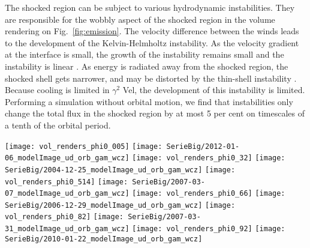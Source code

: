 \documentclass[usenatbib]{mnras}%
\begin{document}
The shocked region can be subject to various hydrodynamic instabilities. They are responsible for the wobbly aspect of the shocked region in the volume rendering on Fig.~\ref{fig:emission}. The velocity difference between the winds leads to the development of the Kelvin-Helmholtz instability.  As the velocity gradient at the interface is small, the growth of the instability remains small and the instability is linear \citep{2011MNRAS.418.2618L}.  As energy is radiated away from the shocked region, the shocked shell gets narrower, and may be distorted by the thin-shell instability \citep{1994ApJ...428..186V}. Because cooling is limited in $\gamma^2$ Vel, the development of this instability is limited. Performing a simulation without orbital motion, we find that instabilities only change the total flux in the shocked region by at most 5 per cent  on timescales of a tenth of the orbital period.




 \begin{figure*}
   \centering
  \texttt{[image: vol\_renders\_phi0\_005]}
   \texttt{[image: SerieBig/2012-01-06\_modelImage\_ud\_orb\_gam\_wcz]}
     \texttt{[image: vol\_renders\_phi0\_32]}
 \texttt{[image: SerieBig/2004-12-25\_modelImage\_ud\_orb\_gam\_wcz]}
 \texttt{[image: vol\_renders\_phi0\_514]}
 \texttt{[image: SerieBig/2007-03-07\_modelImage\_ud\_orb\_gam\_wcz]}
   \texttt{[image: vol\_renders\_phi0\_66]}
 \texttt{[image: SerieBig/2006-12-29\_modelImage\_ud\_orb\_gam\_wcz]}
   \texttt{[image: vol\_renders\_phi0\_82]}
 \texttt{[image: SerieBig/2007-03-31\_modelImage\_ud\_orb\_gam\_wcz]}
 \texttt{[image: vol\_renders\_phi0\_92]}
 \texttt{[image: SerieBig/2010-01-22\_modelImage\_ud\_orb\_gam\_wcz]}
  \caption{Volume rendering of the logarithm of the density in the shocked region (left) and the square root of the continuum  intensity maps at 2$\mu$m (right; different scale) at six of the observed phases ($\phi=0.01, 0.32, 0.51, 0.66, 0.82,0.92$ from upper left to lower right). The same fluxes of each component were used here: 54 per cent of the total flux for the O star (uniform disk), 41 per cent for the WR star (Gaussian disk) and 5 per cent for the wind collision zone. On the volume rendering, the WR star is a bright red spot while the O star is too embedded in the wind collision region to be distinguished.}
  \label{fig:emission}
 \end{figure*}
\end{document}
